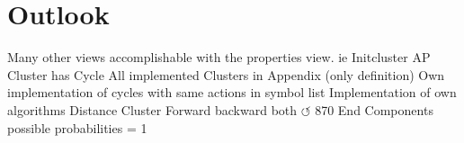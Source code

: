 \documentclass[preview]{standalone}
\begin{document}
\section{Outlook}
Many other views accomplishable with the properties view. ie Initcluster
AP Cluster has Cycle
All implemented Clusters in Appendix (only definition)
Own implementation of cycles with same actions
\intmodn {} \natnums in symbol list
Implementation of own algorithms
Distance Cluster Forward backward both
$\circlearrowleft$
870 End Components possible
probabilities = 1
\end{document}
